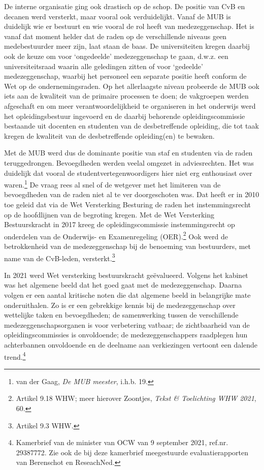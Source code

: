 \documentclass[smallauthor, chapterhaspagenum, nochapterinheader, pagenuminheader,  bigchapnum,medium2, tocpages, garamond, titleinheader]{jote-book}
\begin{document}
	De interne organisatie ging ook drastisch op de schop. De positie van CvB en decanen werd versterkt, maar vooral ook verduidelijkt. Vanaf de MUB is duidelijk wie er bestuurt en wie vooral de rol heeft van medezeggenschap. Het is vanaf dat moment helder dat de raden op de verschillende niveaus geen medebestuurder meer zijn, laat staan de baas. De universiteiten kregen daarbij ook de keuze om voor ‘ongedeelde' medezeggenschap te gaan, d.w.z. een universiteitsraad waarin alle geledingen zitten of voor ‘gedeelde' medezeggenschap, waarbij het personeel een separate positie heeft conform de Wet op de ondernemingsraden. Op het allerlaagste niveau probeerde de MUB ook iets aan de kwaliteit van de primaire processen te doen; de vakgroepen werden afgeschaft en om meer verantwoordelijkheid te organiseren in het onderwijs werd het opleidingsbestuur ingevoerd en de daarbij behorende opleidingscommissie bestaande uit docenten en studenten van de desbetreffende opleiding, die tot taak kregen de kwaliteit van de desbetreffende opleiding(en) te bewaken.



	Met de MUB werd dus de dominante positie van staf en studenten via de raden teruggedrongen. Bevoegdheden werden veelal omgezet in adviesrechten. Het was duidelijk dat vooral de studentvertegenwoordigers hier niet erg enthousiast over waren.\footnote{van der Gaag, \emph{De MUB meester}, i.h.b. 19.} De vraag rees al snel of de wetgever met het limiteren van de bevoegdheden van de raden niet al te ver doorgeschoten was. Dat heeft er in 2010 toe geleid dat via de Wet Versterking Besturing de raden het instemmingsrecht op de hoofdlijnen van de begroting kregen. Met de Wet Versterking Bestuurskracht in 2017 kreeg de opleidingscommissie instemmingsrecht op onderdelen van de Onderwijs- en Examenregeling (OER).\footnote{Artikel 9.18 WHW; meer hierover Zoontjes, \emph{Tekst \& Toelichting WHW 2021}, 60.} Ook werd de betrokkenheid van de medezeggenschap bij de benoeming van bestuurders, met name van de CvB-leden, versterkt.\footnote{Artikel 9.3 WHW.}



	In 2021 werd Wet versterking bestuurskracht geëvalueerd. Volgens het kabinet was het algemene beeld dat het goed gaat met de medezeggenschap. Daarna volgen er een aantal kritische noten die dat algemene beeld in belangrijke mate onderuithalen. Zo is er een gebrekkige kennis bij de medezeggenschap over wettelijke taken en bevoegdheden; de samenwerking tussen de verschillende medezeggenschapsorganen is voor verbetering vatbaar; de zichtbaarheid van de opleidingscommissies is onvoldoende; de medezeggenschappers raadplegen hun achterbannen onvoldoende en de deelname aan verkiezingen vertoont een dalende trend.\footnote{Kamerbrief van de minister van OCW van 9 september 2021, ref.nr. 29387772. Zie ook de bij deze kamerbrief meegestuurde evaluatierapporten van Berenschot en ReseachNed.}
\end{document}
